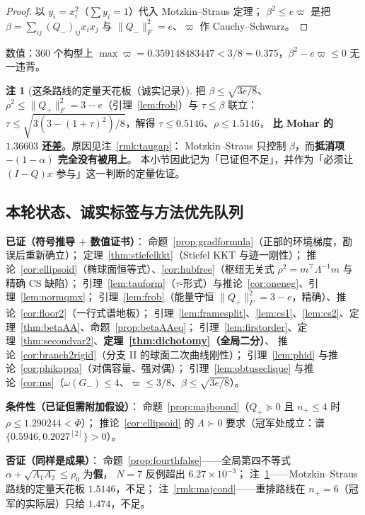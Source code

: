 \documentclass[UTF8,11pt]{ctexart}
\theoremstyle{definition}
\newtheorem{remark}[theorem]{注}
\newcommand{\Lam}{\Lambda}
\begin{document}
\begin{proof}
以 $y_i=x_i^2$（$\sum y_i=1$）代入 Motzkin--Straus 定理；
$\beta^2\le e\varpi$ 是把 $\beta=\sum_{ij}(Q_-)_{ij}x_ix_j$ 与 $\|Q_-\|_F^2=e$、$\varpi$ 作 Cauchy--Schwarz。
\end{proof}

数值：$360$ 个构型上 $\max\varpi=0.359148483447<3/8=0.375$，$\beta^2-e\varpi\le0$ 无一违背。

\begin{remark}[这条路线的定量天花板（诚实记录）]\label{rmk:mslimit}
把 $\beta\le\sqrt{3e/8}$、$\rho^2\le\|Q_+\|_F^2=3-e$（引理~\ref{lem:frob}）与 $\tau\le\beta$ 联立：
$\tau\le\sqrt{3(3-(1+\tau)^2)/8}$，解得 $\tau\le0.5146$、$\rho\le1.5146$，
\textbf{比 Mohar 的 $1.36603$ 还差}。原因见注~\ref{rmk:taugap}：
Motzkin--Straus 只控制 $\beta$，而\textbf{抵消项 $-(1-\alpha)$ 完全没有被用上}。
本小节因此记为「已证但不足」，并作为「必须让 $(I-Q)x$ 参与」这一判断的定量佐证。
\end{remark}

\subsection{本轮状态、诚实标签与方法优先队列}\label{sec:r1517:status}

\textbf{已证（符号推导 $+$ 数值证书）}：
命题~\ref{prop:gradformula}（正部的环境梯度，勘误后重新确立）；
定理~\ref{thm:stiefelkkt}（Stiefel KKT 与迹一刚性）；
推论~\ref{cor:ellipsoid}（椭球面恒等式）、\ref{cor:hubfree}（枢纽无关式 $\rho^2=m^\top\Lam^{-1}m$ 与精确 CS 缺陷）；
引理~\ref{lem:tauform}（$\tau$-形式）与推论~\ref{cor:oneneg}、引理~\ref{lem:normqmx}；
引理~\ref{lem:frob}（能量守恒 $\|Q_+\|_F^2=3-e$，精确）、推论~\ref{cor:floor2}（一行式谱地板）；
引理~\ref{lem:framesplit}、\ref{lem:cs1}、\ref{lem:cs2}、定理~\ref{thm:betaAA}、命题~\ref{prop:betaAAeq}；
引理~\ref{lem:firstorder}、定理~\ref{thm:secondvar2}、\textbf{定理~\ref{thm:dichotomy}（全局二分）}、
推论~\ref{cor:branch2rigid}（分支 II 的球面二次曲线刚性）；
引理~\ref{lem:phid} 与推论~\ref{cor:phikappa}（对偶容量、强对偶）；
引理~\ref{lem:obtuseclique} 与推论~\ref{cor:ms}（$\omega(G_-)\le4$、$\varpi\le3/8$、$\beta\le\sqrt{3e/8}$）。

\textbf{条件性（已证但需附加假设）}：
命题~\ref{prop:majbound}（$Q_+\succeq0$ 且 $n_+\le4$ 时 $\rho\le1.290244<\Phi$）；
推论~\ref{cor:ellipsoid} 的 $\Lam\succ0$ 要求（冠军处成立：谱 $\{0.5946,0.2027^{[2]}\}>0$）。

\textbf{否证（同样是成果）}：
命题~\ref{prop:fourthfalse}——全局第四不等式 $\alpha+\sqrt{A_1A_2}\le\rho_0$ 为\textbf{假}，
$N=7$ 反例超出 $6.27\times10^{-3}$；
注~\ref{rmk:mslimit}——Motzkin--Straus 路线的定量天花板 $1.5146$，不足；
注~\ref{rmk:majcond}——重排路线在 $n_+=6$（冠军的实际层）只给 $1.474$，不足。
\end{document}
